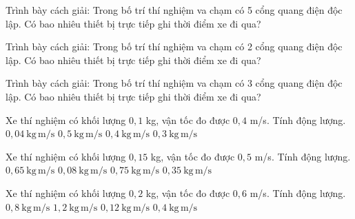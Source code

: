 \begin{bt}
Trình bày cách giải: Trong bố trí thí nghiệm va chạm có 5 cổng quang điện độc lập. Có bao nhiêu thiết bị trực tiếp ghi thời điểm xe đi qua?
\end{bt}

\begin{bt}
Trình bày cách giải: Trong bố trí thí nghiệm va chạm có 2 cổng quang điện độc lập. Có bao nhiêu thiết bị trực tiếp ghi thời điểm xe đi qua?
\end{bt}

\begin{bt}
Trình bày cách giải: Trong bố trí thí nghiệm va chạm có 3 cổng quang điện độc lập. Có bao nhiêu thiết bị trực tiếp ghi thời điểm xe đi qua?
\end{bt}

\begin{ex}
Xe thí nghiệm có khối lượng $0,1$ kg, vận tốc đo được $0,4$ m/s. Tính động lượng.
\choice
{\True $0,04\ \mathrm{kg\,m/s}$}
{$0,5\ \mathrm{kg\,m/s}$}
{$0,4\ \mathrm{kg\,m/s}$}
{$0,3\ \mathrm{kg\,m/s}$}
\end{ex}

\begin{ex}
Xe thí nghiệm có khối lượng $0,15$ kg, vận tốc đo được $0,5$ m/s. Tính động lượng.
\choice
{$0,65\ \mathrm{kg\,m/s}$}
{\True $0,08\ \mathrm{kg\,m/s}$}
{$0,75\ \mathrm{kg\,m/s}$}
{$0,35\ \mathrm{kg\,m/s}$}
\end{ex}

\begin{ex}
Xe thí nghiệm có khối lượng $0,2$ kg, vận tốc đo được $0,6$ m/s. Tính động lượng.
\choice
{$0,8\ \mathrm{kg\,m/s}$}
{$1,2\ \mathrm{kg\,m/s}$}
{\True $0,12\ \mathrm{kg\,m/s}$}
{$0,4\ \mathrm{kg\,m/s}$}
\end{ex}

